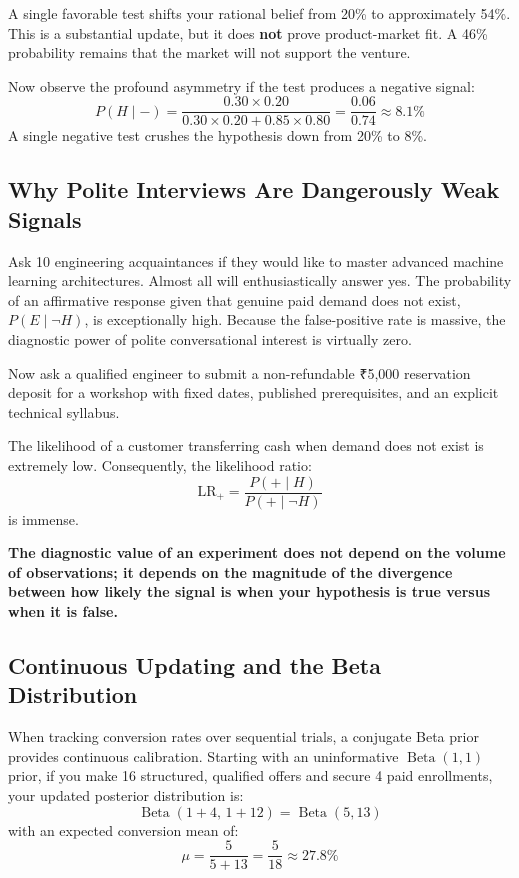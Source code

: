 A single favorable test shifts your rational belief from 20\% to approximately 54\%. This is a substantial update, but it does \textbf{not} prove product-market fit. A 46\% probability remains that the market will not support the venture.

Now observe the profound asymmetry if the test produces a negative signal:
\begin{equation*}
P(H \mid -) = \frac{0.30 \times 0.20}{0.30 \times 0.20 + 0.85 \times 0.80} = \frac{0.06}{0.74} \approx 8.1\%
\end{equation*}
A single negative test crushes the hypothesis down from 20\% to 8\%.

\subsection{Why Polite Interviews Are Dangerously Weak Signals}

Ask 10 engineering acquaintances if they would like to master advanced machine learning architectures. Almost all will enthusiastically answer yes. The probability of an affirmative response given that genuine paid demand does not exist, $P(E \mid \neg H)$, is exceptionally high. Because the false-positive rate is massive, the diagnostic power of polite conversational interest is virtually zero.

Now ask a qualified engineer to submit a non-refundable ₹5,000 reservation deposit for a workshop with fixed dates, published prerequisites, and an explicit technical syllabus.

The likelihood of a customer transferring cash when demand does not exist is extremely low. Consequently, the likelihood ratio:
\begin{equation}
\mathrm{LR}_+ = \frac{P(+ \mid H)}{P(+ \mid \neg H)}
\end{equation}
is immense.

\textbf{The diagnostic value of an experiment does not depend on the volume of observations; it depends on the magnitude of the divergence between how likely the signal is when your hypothesis is true versus when it is false.}

\subsection{Continuous Updating and the Beta Distribution}

When tracking conversion rates over sequential trials, a conjugate Beta prior provides continuous calibration. Starting with an uninformative $\operatorname{Beta}(1,1)$ prior, if you make 16 structured, qualified offers and secure 4 paid enrollments, your updated posterior distribution is:
\begin{equation}
\operatorname{Beta}(1 + 4,\, 1 + 12) = \operatorname{Beta}(5, 13)
\end{equation}
with an expected conversion mean of:
\begin{equation*}
\mu = \frac{5}{5 + 13} = \frac{5}{18} \approx 27.8\%
\end{equation*}

